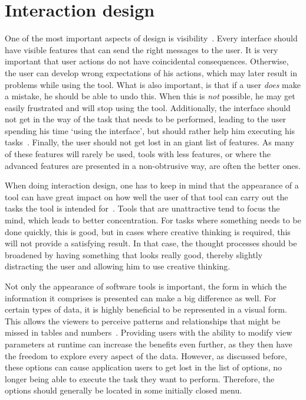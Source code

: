 \section{Interaction design}
One of the most important aspects of design is visibility~\cite{norman2002design}. Every interface should have visible features that can send the right messages to the user. It is very important that user actions do not have coincidental consequences. Otherwise, the user can develop wrong expectations of his actions, which may later result in problems while using the tool. What is also important, is that if a user \emph{does} make a mistake, he should be able to undo this. When this is \emph{not} possible, he may get easily frustrated and will stop using the tool. Additionally, the interface should not get in the way of the task that needs to be performed, leading to the user spending his time `using the interface', but should rather help him executing his tasks~\cite{norman1990interfaces}. Finally, the user should not get lost in an giant list of features. As many of these features will rarely be used, tools with less features, or where the advanced features are presented in a non-obtrusive way, are often the better ones.

When doing interaction design, one has to keep in mind that the appearance of a tool can have great impact on how well the user of that tool can carry out the tasks the tool is intended for~\cite{norman2002emotion}. Tools that are unattractive tend to focus the mind, which leads to better concentration. For tasks where something needs to be done quickly, this is good, but in cases where creative thinking is required, this will not provide a satisfying result. In that case, the thought processes should be broadened by having something that looks really good, thereby slightly distracting the user and allowing him to use creative thinking.

Not only the appearance of software tools is important, the form in which the information it comprises is presented can make a big difference as well. For certain types of data, it is highly beneficial to be represented in a visual form. This allows the viewers to perceive patterns and relationships that might be missed in tables and numbers~\cite{gallopoulos1994computer}. Providing users with the ability to modify view parameters at runtime can increase the benefits even further, as they then have the freedom to explore every aspect of the data. However, as discussed before, these options can cause application users to get lost in the list of options, no longer being able to execute the task they want to perform. Therefore, the options should generally be located in some initially closed menu.

